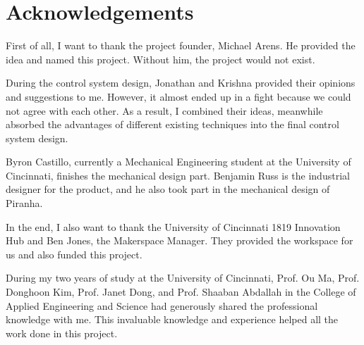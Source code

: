 \chapter*{Acknowledgements} %

First of all, I want to thank the project founder, Michael Arens. He provided the idea and named this project. Without him, the project would not exist. 

During the control system design, Jonathan and Krishna provided their opinions and suggestions to me. However, it almost ended up in a fight because we could not agree with each other. As a result, I combined their ideas, meanwhile absorbed the advantages of different existing techniques into the final control system design.

Byron Castillo, currently a Mechanical Engineering student at the University of Cincinnati, finishes the mechanical design part. Benjamin Russ is the industrial designer for the product, and he also took part in the mechanical design of Piranha.

In the end, I also want to thank the University of Cincinnati 1819 Innovation Hub and Ben Jones, the Makerspace Manager. They provided the workspace for us and also funded this project.

During my two years of study at the University of Cincinnati, Prof. Ou Ma, Prof. Donghoon Kim, Prof. Janet Dong, and Prof. Shaaban Abdallah in the College of Applied Engineering and Science had generously shared the professional knowledge with me. This invaluable knowledge and experience helped all the work done in this project.
